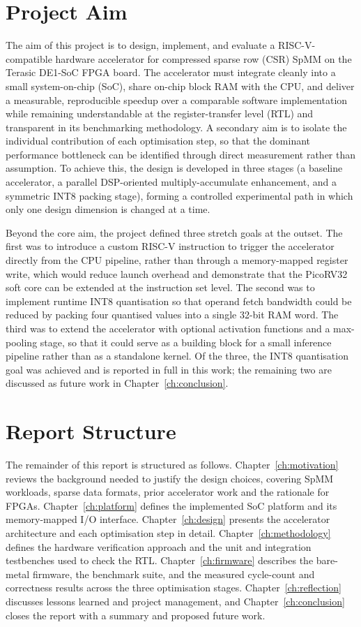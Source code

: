 \section{Project Aim}

The aim of this project is to design, implement, and evaluate a
RISC-V-compatible hardware accelerator for compressed sparse row (CSR) SpMM on
the Terasic DE1-SoC FPGA board. The accelerator must integrate cleanly
into a small system-on-chip (SoC), share on-chip block RAM with the CPU,
and deliver a measurable, reproducible speedup over a comparable software
implementation while remaining understandable at the register-transfer
level (RTL) and transparent in its benchmarking methodology. A secondary
aim is to isolate the individual contribution of each optimisation step,
so that the dominant performance bottleneck can be identified through
direct measurement rather than assumption. To achieve this, the design
is developed in three stages (a baseline accelerator, a parallel
DSP-oriented multiply-accumulate enhancement, and a symmetric INT8
packing stage), forming a controlled experimental path in which only
one design dimension is changed at a time.

Beyond the core aim, the project defined three stretch goals at the
outset. The first was to introduce a custom RISC-V instruction to trigger
the accelerator directly from the CPU pipeline, rather than through a
memory-mapped register write, which would reduce launch overhead and
demonstrate that the PicoRV32 soft core can be extended at the instruction
set level. The second was to implement runtime INT8 quantisation so that
operand fetch bandwidth could be reduced by packing four quantised values
into a single 32-bit RAM word. The third was to extend the accelerator
with optional activation functions and a max-pooling stage, so that it
could serve as a building block for a small inference pipeline rather
than as a standalone kernel. Of the three, the INT8 quantisation goal
was achieved and is reported in full in this work; the remaining two
are discussed as future work in Chapter~\ref{ch:conclusion}.

\section{Report Structure}

The remainder of this report is structured as follows.
Chapter~\ref{ch:motivation} reviews the background needed to justify the
design choices, covering SpMM workloads, sparse data formats, prior
accelerator work and the rationale for FPGAs.
Chapter~\ref{ch:platform} defines the implemented SoC platform and its
memory-mapped I/O interface. Chapter~\ref{ch:design} presents the
accelerator architecture and each optimisation step in detail.
Chapter~\ref{ch:methodology} defines the hardware verification approach
and the unit and integration testbenches used to check the RTL.
Chapter~\ref{ch:firmware} describes the bare-metal firmware, the
benchmark suite, and the measured cycle-count and correctness results
across the three optimisation stages. Chapter~\ref{ch:reflection}
discusses lessons learned and project management, and
Chapter~\ref{ch:conclusion} closes the report with a summary and proposed
future work.
